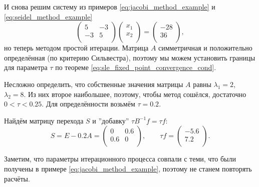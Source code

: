 \documentclass{article}
\begin{document}
\begin{example}
	И снова решим систему из примеров \eqref{eq:jacobi_method_example} и
	\eqref{eq:seidel_method_example}
	\[
		\begin{pmatrix}
			5	& -3 \\
			-3	& 5  \\
		\end{pmatrix}
		\begin{pmatrix}
			x_1 \\
			x_2 \\
		\end{pmatrix}
		=
		\begin{pmatrix}
			-28 \\
			36  \\
		\end{pmatrix}
		,
	\]
	но теперь методом простой итерации. Матрица $A$ симметричная и
	положительно определённая (по критерию Сильвестра), поэтому мы можем
	установить границы для параметра $\tau$ по теореме
	\eqref{eq:sle_fixed_point_convergence_cond}.

	Несложно определить, что собственные значения матрицы $A$ равны
	$\lambda_1=2$, $\lambda_2=8$. Из них второе наибольшее, поэтому,
	чтобы метод сошёлся, достаточно $0<\tau<0.25$. Для определённости
	возьмём $\tau=0.2$.

	Найдём матрицу перехода $S$ и ''добавку'' $\tau B^{-1}f=\tau f$:
	\[S=E-0.2A=
		\begin{pmatrix}
			0	& 0.6 \\
			0.6	& 0   \\
		\end{pmatrix}
		,\qquad
		\tau f=
		\begin{pmatrix}
			-5.6 \\
			7.2  \\
		\end{pmatrix}
		.
	\]

	Заметим, что параметры итерационного процесса совпали с теми, что
	были получены в примере \eqref{eq:jacobi_method_example}, поэтому
	не станем повторять расчёты.
\end{example}
\end{document}
